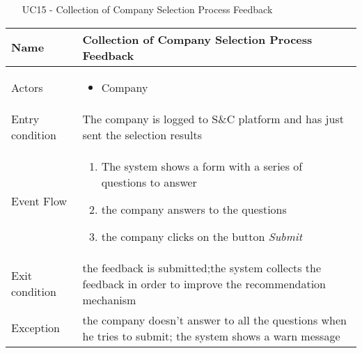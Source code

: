 				\begin{table} [H]
					\centering
					\begin{itemize}
						\item [UC15] - Collection of Company Selection Process Feedback
					\end{itemize}
					
					\begin{tabular}{|| P{7.5cm} | P{7.5cm} ||}
						\hline
						Name & Collection of Company Selection Process Feedback \\
						\hline
						Actors & \parbox{5cm}{\begin{itemize}
								\item Company
							\end{itemize}
						} \\
						\hline
						Entry condition & The company is logged to S\&C platform and has just sent the selection results \\
						\hline
						Event Flow & \parbox{5cm}{\begin{enumerate}[label=\alpha]
								\item The system shows a form with a series of questions to answer 
								\item the company answers to the questions
								\item the company clicks on the button \textit{Submit}
						\end{enumerate}} \\
						\hline 
						Exit condition & the feedback is submitted;the system collects the
						feedback in order to improve the recommendation
						mechanism \\
						\hline
						Exception & the company doesn't answer to all the questions when he tries to submit; the system shows a warn message \\
						\hline
					\end{tabular}
				\end{table}
				
